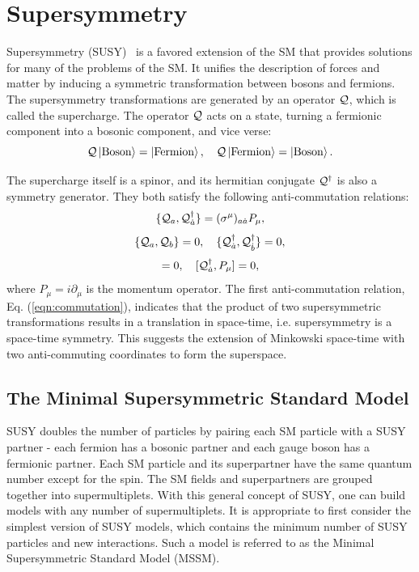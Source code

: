 \documentclass[thesis.tex]{subfiles}
\begin{document}
\section{Supersymmetry}

Supersymmetry (SUSY)~\cite{SUSY:Ramond, SUSY:Likhtman, SUSY:Schwarz,
SUSY:Volkov,SUSY:Zumino,SUSY:Wess,SUSY:Fayet,SUSY:Nilles} is a favored extension of the SM that provides solutions for many of the problems of the SM. 
It unifies the description of forces and matter by inducing a symmetric transformation between bosons and fermions. 
The supersymmetry transformations are generated by an operator $\mathcal{Q}$, which is called the supercharge. 
The operator $\mathcal{Q}$ acts on a state, turning a fermionic component into a bosonic component, and vice verse: 
      \begin{equation}
        \mathcal{Q} \ket{ \text{Boson} } = \ket{ \text{Fermion}},   \quad   \mathcal{Q} \ket{\text{Fermion}} = \ket{ \text{Boson}}.
      \end{equation} 

The supercharge itself is a spinor, and its hermitian conjugate $\mathcal{Q}^\dagger$ is also a symmetry generator. 
They both satisfy the following anti-commutation relations:
    \begin{equation}
     \{\mathcal{Q}_a, \mathcal{Q}_{\dot{a}}^\dagger \} = (\sigma^\mu)_{a\dot{a}} P_\mu,
      \label{eqn:commutation}
     \end{equation} 
    \begin{equation}
     \{\mathcal{Q}_a, \mathcal{Q}_b \} = 0, \quad
     \{\mathcal{Q}_{\dot{a}}^\dagger, \mathcal{Q}_{\dot{b}}^\dagger \} = 0,
      \end{equation} 
      \begin{equation}
     [\OpQ_a, P_\mu] = 0, \quad  [\OpQ_{\dot{a}}^\dagger,  P_\mu] = 0,
    \end{equation} 
where $P_\mu = i\partial_\mu$ is the momentum operator. 
The first anti-commutation relation, Eq. (\ref{eqn:commutation}), indicates that the product of two supersymmetric transformations results in a translation in space-time, i.e. supersymmetry is a space-time symmetry. This suggests the extension of Minkowski space-time with two anti-commuting coordinates to form the superspace. 

\subsection{The Minimal Supersymmetric Standard Model }
SUSY doubles the number of particles by pairing each SM particle with a SUSY partner - each fermion has a bosonic partner and each gauge boson has a fermionic partner. 
Each SM particle and its superpartner have the same quantum number except for the spin. 
The SM fields and superpartners are grouped together into supermultiplets. 
With this general concept of SUSY, one can build models with any number of supermultiplets. 
It is appropriate to first consider the simplest version of SUSY models, which contains the minimum number of SUSY particles and new interactions. 
Such a model is referred to as the Minimal Supersymmetric Standard Model (MSSM). 
\end{document}
